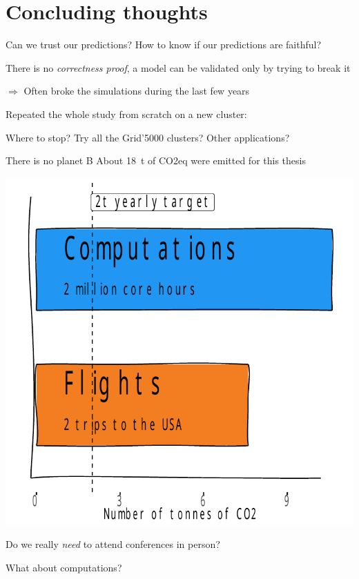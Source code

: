\documentclass[10pt]{beamer}
\newcommand{\NSI}[2]{\SI[group-separator={,}]{#1}{#2}\xspace}
\begin{document}
\section{Concluding thoughts}

\begin{frame}{Can we trust our predictions?}
    How to know if our predictions are faithful?

    There is no \emph{correctness proof}, a model can be validated only by \alert{trying to break it}

    \pause \medskip
    \(\Rightarrow\) Often broke the simulations during the last few years

    \pause
    \alert{Repeated} the whole study \alert{from scratch} on a new cluster:~~~\alert{\textbf{\Huge \checkmark}}

    Where to stop? Try all the Grid'5000 clusters? Other applications?
\end{frame}

\begin{frame}{There is no planet B}
    About \NSI{18}{\tonne} of CO2eq were emitted for this thesis

    \begin{minipage}{0.38\linewidth}
        \includegraphics[width=\linewidth]{img/slides/co2.pdf}
    \end{minipage} \hfill\pause%
    \begin{minipage}{0.6\linewidth}
        Do we really \emph{need} to attend conferences in person?
        \medskip

        What about computations?
    \end{minipage} \hfill
\end{frame}
\end{document}
